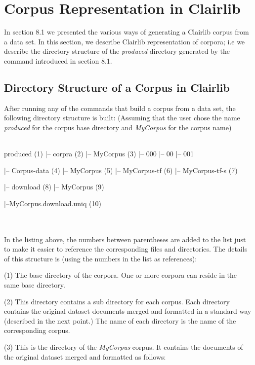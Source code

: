 \section{Corpus Representation in Clairlib}

In section 8.1 we presented the various ways of generating a Clairlib corpus from a data set. In this section, we describe Clairlib representation of corpora; i.e we describe the directory structure of the \emph{produced} directory generated by the command introduced in section 8.1.

\subsection{Directory Structure of a Corpus in Clairlib}

After running any of the commands that build a corpus from a data set, the following directory structure is built: (Assuming that the user chose the name \emph{produced} for the corpus base directory and \emph{MyCorpus} for the corpus name)
\\
\\
\begin{boxedverbatim}
produced (1)
|-- corpra (2)
    |-- MyCorpus (3)
        |-- 000
               |-- 00
        |-- 001

|-- Corpus-data (4)
    |-- MyCorpus (5)
    |-- MyCorpus-tf (6)
    |-- MyCorpus-tf-s (7)

|-- download (8)
    |-- MyCorpus (9)

|--MyCorpus.download.uniq (10)
\end{boxedverbatim}
\\
\\
In the listing above, the numbers between parentheses are added to the list just to make it easier to reference the corresponding files and directories. The details of this structure is (using the numbers in the list as references):

(1) The base directory of the corpora. One or more corpora can reside in the same base directory.

(2) This directory contains a sub directory for each corpus. Each directory contains the original dataset documents merged and formatted in a standard way (described in the next point.) The name of each directory is the name of the corresponding corpus.

(3) This is the directory of the \emph{MyCorpus} corpus. It contains the documents of the original dataset merged and formatted as follows:

